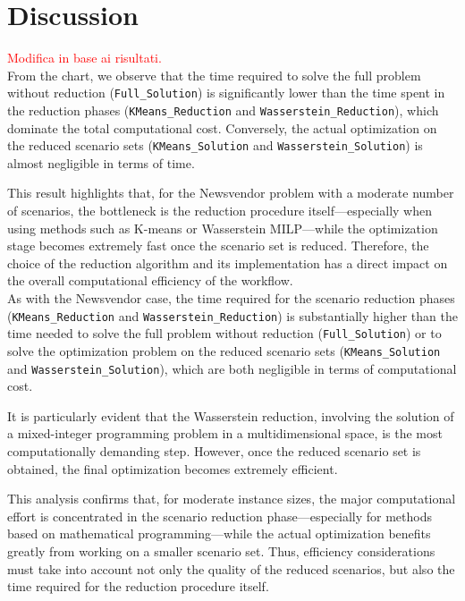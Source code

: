 \documentclass[a4paper,12pt]{article}
\begin{document}
	\newpage
	
	\section{Discussion}
	
	\textcolor{red}{Modifica in base ai risultati.}\\
	
	\noindent From the chart, we observe that the time required to solve the full problem without reduction (\texttt{Full\_Solution}) is significantly lower than the time spent in the reduction phases (\texttt{KMeans\_Reduction} and \texttt{Wasserstein\_Reduction}), which dominate the total computational cost. Conversely, the actual optimization on the reduced scenario sets (\texttt{KMeans\_Solution} and \texttt{Wasserstein\_Solution}) is almost negligible in terms of time. 
	
	This result highlights that, for the Newsvendor problem with a moderate number of scenarios, the bottleneck is the reduction procedure itself—especially when using methods such as K-means or Wasserstein MILP—while the optimization stage becomes extremely fast once the scenario set is reduced. Therefore, the choice of the reduction algorithm and its implementation has a direct impact on the overall computational efficiency of the workflow. \\
	
	
	
	As with the Newsvendor case, the time required for the scenario reduction phases (\texttt{KMeans\_Reduction} and \texttt{Wasserstein\_Reduction}) is substantially higher than the time needed to solve the full problem without reduction (\texttt{Full\_Solution}) or to solve the optimization problem on the reduced scenario sets (\texttt{KMeans\_Solution} and \texttt{Wasserstein\_Solution}), which are both negligible in terms of computational cost.
	
	It is particularly evident that the Wasserstein reduction, involving the solution of a mixed-integer programming problem in a multidimensional space, is the most computationally demanding step. However, once the reduced scenario set is obtained, the final optimization becomes extremely efficient. 
	
	This analysis confirms that, for moderate instance sizes, the major computational effort is concentrated in the scenario reduction phase—especially for methods based on mathematical programming—while the actual optimization benefits greatly from working on a smaller scenario set. Thus, efficiency considerations must take into account not only the quality of the reduced scenarios, but also the time required for the reduction procedure itself.
	
\end{document}
